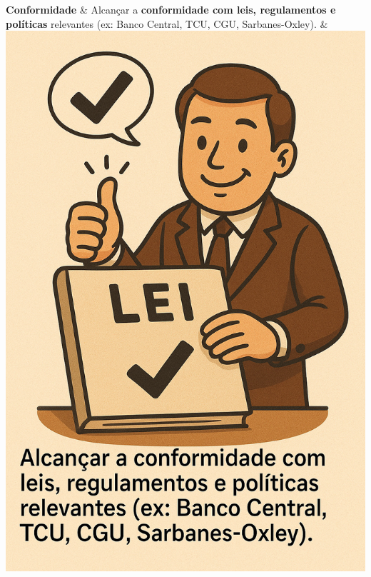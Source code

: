 \documentclass[
]{book}
\begin{document}
\begin{longtable}[]
\textbf{Conformidade} & Alcançar a \textbf{conformidade com leis, regulamentos e políticas} relevantes (ex: Banco Central, TCU, CGU, Sarbanes-Oxley). & \includegraphics{images/07-2025-09-23_24/05-motivadores-conformidade_legal.jpg} \\

\end{longtable}
\end{document}

